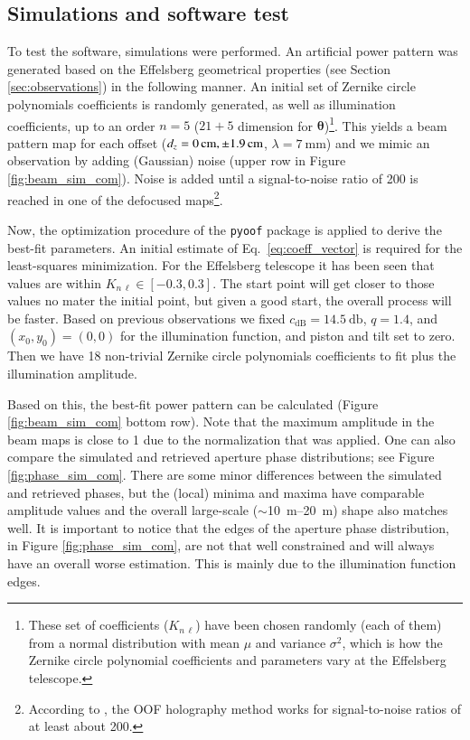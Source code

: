 \documentclass[
    ]
    {aa}
\begin{document}
    \subsection{Simulations and software test}
    \label{sec:simulations}
    To test the software, simulations were performed. An artificial power pattern was generated based on the Effelsberg geometrical properties (see Section \ref{sec:observations}) in the following manner.
    An initial set of Zernike circle polynomials coefficients is randomly generated, as well as illumination coefficients, up to an order $n = 5$ ($21 + 5$ dimension for $\boldsymbol\theta$)\footnote{These set of coefficients ($K_{n\,\ell}$) have been chosen randomly (each of them) from a normal distribution with mean $\mu$ and variance $\sigma^2$, which is how the Zernike circle polynomial coefficients and parameters vary at the Effelsberg telescope.}. This yields a beam pattern map for each offset ($d_z = \SIlist[list-pair-separator = {, }]{0;\pm1.9}{\cm}$, $\lambda=\SI{7}{\mm}$) and we mimic an observation by adding (Gaussian) noise (upper row in Figure \ref{fig:beam_sim_com}). Noise is added until a signal-to-noise ratio of \num{200} is reached in one of the defocused maps\footnote{According to \citet{2007A&A...465..679N}, the OOF holography method works for signal-to-noise ratios of at least about 200.}.

    Now, the optimization procedure of the \texttt{pyoof} package is applied to derive the best-fit parameters. An initial estimate of Eq.~\eqref{eq:coeff_vector} is required for the least-squares minimization. For the Effelsberg telescope it has been seen that values are within $K_{n\,\ell} \in [-0.3, 0.3]$. The start point will get closer to those values no mater the initial point, but given a good start, the overall process will be faster. Based on previous observations we fixed $c_\text{dB}=\SI{14.5}{\decibel}$, $q=1.4$, and $(x_0, y_0)= (0, 0)$ for the illumination function, and piston and tilt set to zero. Then we have 18 non-trivial Zernike circle polynomials coefficients to fit plus the illumination amplitude. 

    Based on this, the best-fit power pattern can be calculated (Figure \ref{fig:beam_sim_com} bottom row). Note that the maximum amplitude in the beam maps is close to 1 due to the normalization that was applied. One can also compare the simulated and retrieved aperture phase distributions; see Figure \ref{fig:phase_sim_com}. 
    There are some minor differences between the simulated and retrieved phases, but the (local) minima and maxima have comparable amplitude values and the overall large-scale ($\sim$\SIrange{10}{20}{\metre}) shape also matches well. It is important to notice that the edges of the aperture phase distribution, in Figure \ref{fig:phase_sim_com}, are not that well constrained and will always have an overall worse estimation. This is mainly due to the illumination function edges.
\end{document}
